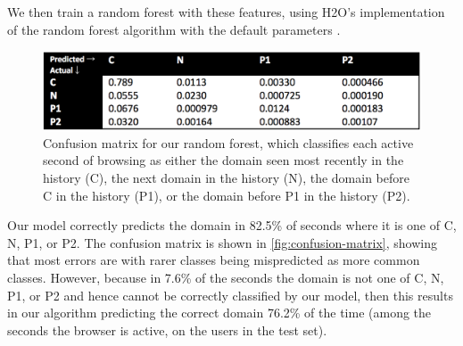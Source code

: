 \documentclass{sigchi}
\begin{document}
We then train a random forest with these features, using H2O's implementation of the random forest algorithm with the default parameters \cite{randomforest}.

\begin{figure}
    \centering
    \includegraphics[width=0.9\columnwidth]{confusion-matrix}
    \caption{Confusion matrix for our random forest, which classifies each active second of browsing as either the domain seen most recently in the history (C), the next domain in the history (N), the domain before C in the history (P1), or the domain before P1 in the history (P2).}
    \label{fig:confusion-matrix}
\end{figure}

Our model correctly predicts the domain in 82.5\% of seconds where it is one of C, N, P1, or P2. The confusion matrix is shown in \autoref{fig:confusion-matrix}, showing that most errors are with rarer classes being mispredicted as more common classes. However, because in 7.6\% of the seconds the domain is not one of C, N, P1, or P2 and hence cannot be correctly classified by our model, then this results in our algorithm predicting the correct domain 76.2\% of the time (among the seconds the browser is active, on the users in the test set).





\end{document}
